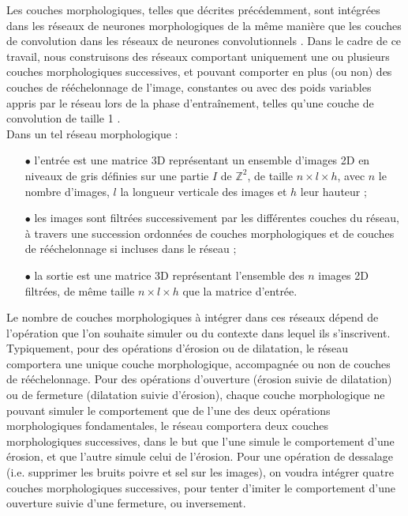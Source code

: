 Les couches morphologiques, telles que décrites précédemment, sont intégrées dans les réseaux de neurones morphologiques de la même manière que les couches de convolution dans les réseaux de neurones convolutionnels \cite{Hassoun_1996}. Dans le cadre de ce travail, nous construisons des réseaux comportant uniquement une ou plusieurs couches morphologiques successives, et pouvant comporter en plus (ou non) des couches de rééchelonnage de l'image, constantes ou avec des poids variables appris par le réseau lors de la phase d'entraînement, telles qu'une couche de convolution de taille 1 \cite{Keiller_2019, Bloch_2021}. \\

\vspace{-0.6mm}
\noindent Dans un tel réseau morphologique :
\vspace{0.8mm}
\begin{itemize}%
    \item[$\bullet$] l'entrée est une matrice 3D représentant un ensemble d'images 2D en niveaux de gris définies sur une partie $I$ de $\mathbb{Z}^2$, de taille $n \times l \times h$, avec $n$ le nombre d'images, $l$ la longueur verticale des images et $h$ leur hauteur ;
    \vspace{0.4mm}
    \item[$\bullet$] les images sont filtrées successivement par les différentes couches du réseau, à travers une succession ordonnées de couches morphologiques et de couches de rééchelonnage si incluses dans le réseau ;
    \vspace{0.4mm}
    \item[$\bullet$] la sortie est une matrice 3D représentant l'ensemble des $n$ images 2D filtrées, de même taille $n \times l \times h$ que la matrice d'entrée. \\
\end{itemize}

\vspace{-1.0mm}
Le nombre de couches morphologiques à intégrer dans ces réseaux dépend de l'opération que l'on souhaite simuler ou du contexte dans lequel ils s'inscrivent. \\

\vspace{-1.6mm}
\noindent Typiquement, pour des opérations d'érosion ou de dilatation, le réseau comportera une unique couche morphologique, accompagnée ou non de couches de rééchelonnage. Pour des opérations d'ouverture (érosion suivie de dilatation) ou de fermeture (dilatation suivie d'érosion), chaque couche morphologique ne pouvant simuler le comportement que de l'une des deux opérations morphologiques fondamentales, le réseau comportera deux couches morphologiques successives, dans le but que l'une simule le comportement d'une érosion, et que l'autre simule celui de l'érosion. Pour une opération de dessalage (i.e. supprimer les bruits poivre et sel sur les images), on voudra intégrer quatre couches morphologiques successives, pour tenter d'imiter le comportement d'une ouverture suivie d'une fermeture, ou inversement. \\

